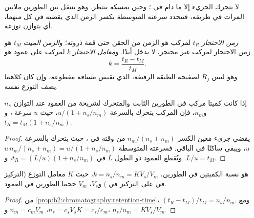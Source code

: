 لا يتحرك الجزيء إلا ما دام في ؛ وحين يمسكه 
ينتظر. وهو ينتقل بين الطورين ملايين المرات في طريقه، فتتحدد سرعته المتوسطة
بكسر الزمن الذي يقضيه في كل منهما، أي بتوازن توزعه.

\begin{definition}[الاحتجاز]\label{def:b2:chromatography:retention}
\emph{زمن الاحتجاز} $t_R$ لمركب هو الزمن من الحقن حتى
قمة ذروته؛ و\emph{الزمن الميت} $t_M$ هو زمن الاحتجاز لمركب
غير محتجز، لا يدخل  أبدًا. و\emph{معامل الاحتجاز}
$k$ لمركب على عمود هو
\begin{equation*}
k = \frac{t_R - t_M}{t_M}.
\end{equation*}
وهو ليس $R_f$ لصفيحة الطبقة الرقيقة، الذي يقيس مسافة مقطوعة، وإن كان كلاهما يصف
التوزع نفسه.
\end{definition}

\begin{proposition}\label{prop:b2:chromatography:retention-time}
إذا كانت كميتا مركب في الطورين الثابت والمتحرك لشريحة من العمود عند التوازن
$n_s$ و$n_m$، فإن المركب يتحرك بالسرعة $u/(1 + n_s/n_m)$، حيث $u$ سرعة ،
و$t_R = t_M(1 + n_s/n_m)$.
\end{proposition}

\begin{proof}
يقضي جزيء معين الكسر $n_m/(n_s + n_m)$ من وقته في ، حيث يتحرك بالسرعة
$u$، ويبقى ساكنًا في الباقي. فسرعته المتوسطة $u\,n_m/(n_s + n_m) = u/(1 + n_s/n_m)$. ويُقطع العمود ذو
الطول $L$ في $t_R = (L/u)(1 + n_s/n_m)$، و$L/u = t_M$.
\end{proof}

\begin{proposition}\label{prop:b2:chromatography:k-and-K}
 هو نسبة الكميتين في الطورين، $k = n_s/n_m = KV_s/V_m$، حيث $K$
معامل التوزع (التركيز في  على التركيز في ) و$V_s$، $V_m$ حجما الطورين في العمود.
\end{proposition}

\begin{proof}
من \cref{prop:b2:chromatography:retention-time}، $(t_R - t_M)/t_M = n_s/n_m$. ومع $n_s = c_sV_s$،
$n_m = c_mV_m$ و$K = c_s/c_m$، $n_s/n_m = KV_s/V_m$.
\end{proof}

